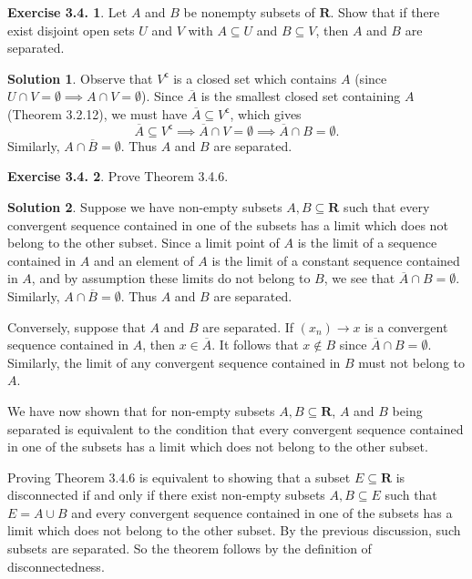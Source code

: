\documentclass[12pt]{article}
\theoremstyle{definition}
\theoremstyle{exercise}
\newtheorem{exercise}{Exercise 3.4.}
\theoremstyle{solution}
\newtheorem*{solution}{Solution}
\newcommand{\setcomp}[1]{#1^{\mathsf{c}}}
\newcommand{\R}{\mathbf{R}}
\begin{document}
\begin{exercise}
\label{ex:5}
    Let \( A \) and \( B \) be nonempty subsets of \( \R \). Show that if there exist disjoint open sets \( U \) and \( V \) with \( A \subseteq U \) and \( B \subseteq V \), then \( A \) and \( B \) are separated.
\end{exercise}

\begin{solution}
    Observe that \( \setcomp{V} \) is a closed set which contains \( A \) (since \( U \cap V = \emptyset \implies A \cap V = \emptyset \)). Since \( \overline{A} \) is the smallest closed set containing \( A \) (Theorem 3.2.12), we must have \( \overline{A} \subseteq \setcomp{V} \), which gives
    \[
        \overline{A} \subseteq \setcomp{V} \implies \overline{A} \cap V = \emptyset \implies \overline{A} \cap B = \emptyset.
    \]
    Similarly, \( A \cap \overline{B} = \emptyset \). Thus \( A \) and \( B \) are separated.
\end{solution}

\begin{exercise}
\label{ex:6}
    Prove Theorem 3.4.6.
\end{exercise}

\begin{solution}
    Suppose we have non-empty subsets \( A, B \subseteq \R \) such that every convergent sequence contained in one of the subsets has a limit which does not belong to the other subset. Since a limit point of \( A \) is the limit of a sequence contained in \( A \) and an element of \( A \) is the limit of a constant sequence contained in \( A \), and by assumption these limits do not belong to \( B \), we see that \( \overline{A} \cap B = \emptyset \). Similarly, \( A \cap \overline{B} = \emptyset \). Thus \( A \) and \( B \) are separated.

    Conversely, suppose that \( A \) and \( B \) are separated. If \( (x_n) \to x \) is a convergent sequence contained in \( A \), then \( x \in \overline{A} \). It follows that \( x \not\in B \) since \( \overline{A} \cap B = \emptyset \). Similarly, the limit of any convergent sequence contained in \( B \) must not belong to \( A \).

    We have now shown that for non-empty subsets \( A, B \subseteq \R \), \( A \) and \( B \) being separated is equivalent to the condition that every convergent sequence contained in one of the subsets has a limit which does not belong to the other subset.

    Proving Theorem 3.4.6 is equivalent to showing that a subset \( E \subseteq \R \) is disconnected if and only if there exist non-empty subsets \( A, B \subseteq E \) such that \( E = A \cup B \) and every convergent sequence contained in one of the subsets has a limit which does not belong to the other subset. By the previous discussion, such subsets are separated. So the theorem follows by the definition of disconnectedness.
\end{solution}
\end{document}

